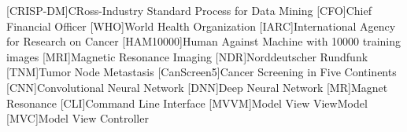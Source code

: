 \begin{acronym}[CRISP-DM]
[CRISP-DM]{CRoss-Industry Standard Process for Data Mining}
[CFO]{Chief Financial Officer}
[WHO]{World Health Organization}
[IARC]{International Agency for Research on Cancer}
[HAM10000]{Human Against Machine with 10000 training images}
[MRI]{Magnetic Resonance Imaging}
[NDR]{Norddeutscher Rundfunk}
[TNM]{Tumor Node Metastasis}
[CanScreen5]{Cancer Screening in Five Continents}
[CNN]{Convolutional Neural Network}
[DNN]{Deep Neural Network}
[MR]{Magnet Resonance}
[CLI]{Command Line Interface}
[MVVM]{Model View ViewModel}
[MVC]{Model View Controller}
\end{acronym}